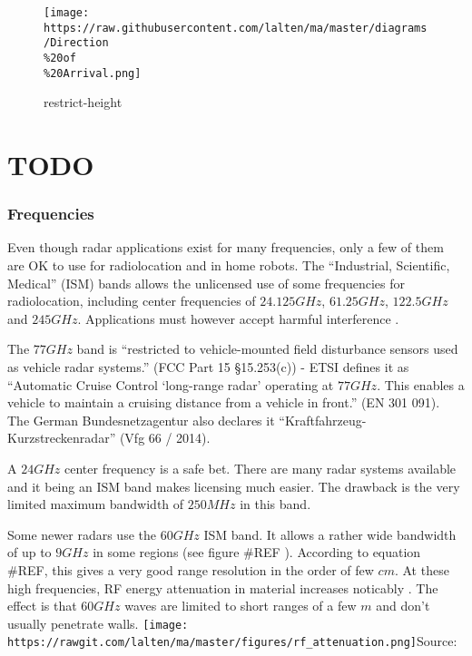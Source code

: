 \begin{figure}
\centering
\texttt{[image: https://raw.githubusercontent.com/lalten/ma/master/diagrams/Direction\\\%20of\\\%20Arrival.png]}
\caption{restrict-height}
\end{figure}

\section{TODO}\label{todo}

\cite{Hacker2010} \cite{Cho2017}

\subsubsection{Frequencies}\label{frequencies}

Even though radar applications exist for many frequencies, only a few of
them are OK to use for radiolocation and in home robots. The
``Industrial, Scientific, Medical'' (ISM) bands allows the unlicensed
use of some frequencies for radiolocation, including center frequencies
of \(24.125 GHz\), \(61.25 GHz\), \(122.5 GHz\) and \(245 GHz\).
Applications must however accept harmful interference \cite{FCC2017}.

The \(77 GHz\) band is ``restricted to vehicle-mounted field disturbance
sensors used as vehicle radar systems.'' (FCC Part 15 §15.253(c)) - ETSI
defines it as ``Automatic Cruise Control `long-range radar' operating at
\(77 GHz\). This enables a vehicle to maintain a cruising distance from
a vehicle in front.'' (EN 301 091). The German Bundesnetzagentur also
declares it ``Kraftfahrzeug-Kurzstreckenradar'' (Vfg 66 / 2014).

A \(24 GHz\) center frequency is a safe bet. There are many radar
systems available and it being an ISM band makes licensing much easier.
The drawback is the very limited maximum bandwidth of \(250MHz\) in this
band.

Some newer radars use the \(60 GHz\) ISM band. It allows a rather wide
bandwidth of up to \(9GHz\) in some regions (see figure \#REF ).
According to equation \#REF, this gives a very good range resolution in
the order of few \(cm\). At these high frequencies, RF energy
attenuation in material increases noticably \cite{FerrisJr.1998}. The
effect is that \(60GHz\) waves are limited to short ranges of a few
\(m\) and don't usually penetrate walls.
\texttt{[image: https://rawgit.com/lalten/ma/master/figures/rf\_attenuation.png]}Source:
\cite{FerrisJr.1998}

